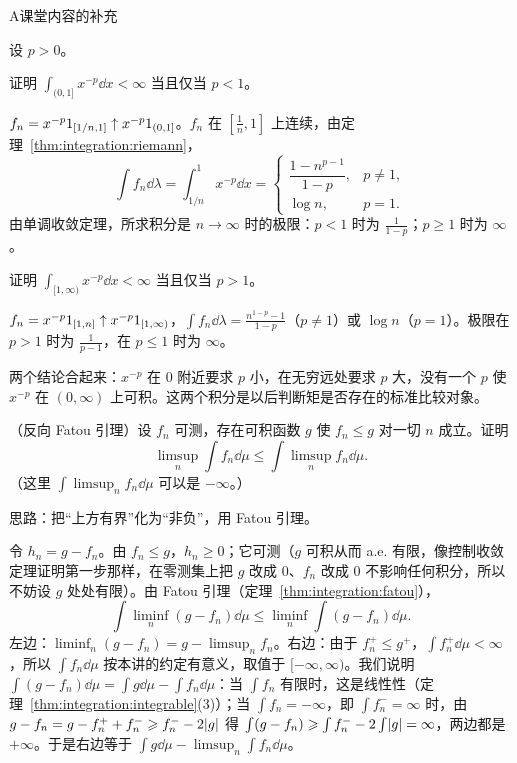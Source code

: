\begin{exercises}{A}{课堂内容的补充}
\item\label{ex:integration:A10} 设 $p>0$。
\begin{questions}
\item 证明 $\int_{(0,1]}x^{-p}\dd x<\infty$ 当且仅当 $p<1$。
\begin{solution}
$f_n=x^{-p}1_{[1/n,1]}\uparrow x^{-p}1_{(0,1]}$。$f_n$ 在 $[\frac1n,1]$ 上连续，由定理~\ref{thm:integration:riemann}，
\[
\int f_n\dd\lambda=\int_{1/n}^1x^{-p}\dd x=\begin{cases}\dfrac{1-n^{p-1}}{1-p},&p\neq1,\\[1ex] \log n,&p=1.\end{cases}
\]
由单调收敛定理，所求积分是 $n\to\infty$ 时的极限：$p<1$ 时为 $\frac1{1-p}$；$p\geqslant1$ 时为 $\infty$。
\end{solution}
\item 证明 $\int_{[1,\infty)}x^{-p}\dd x<\infty$ 当且仅当 $p>1$。
\begin{solution}
$f_n=x^{-p}1_{[1,n]}\uparrow x^{-p}1_{[1,\infty)}$，$\int f_n\dd\lambda=\frac{n^{1-p}-1}{1-p}$（$p\neq1$）或 $\log n$（$p=1$）。极限在 $p>1$ 时为 $\frac1{p-1}$，在 $p\leqslant1$ 时为 $\infty$。

两个结论合起来：$x^{-p}$ 在 $0$ 附近要求 $p$ 小，在无穷远处要求 $p$ 大，没有一个 $p$ 使 $x^{-p}$ 在 $(0,\infty)$ 上可积。这两个积分是以后判断矩是否存在的标准比较对象。
\end{solution}
\end{questions}

\item\label{ex:integration:A11} （反向 Fatou 引理）设 $f_n$ 可测，存在可积函数 $g$ 使 $f_n\leqslant g$ 对一切 $n$ 成立。证明
\[
\limsup_n\int f_n\dd\mu\leqslant\int\limsup_nf_n\dd\mu .
\]
（这里 $\int\limsup_nf_n\dd\mu$ 可以是 $-\infty$。）
\begin{solution}
思路：把“上方有界”化为“非负”，用 Fatou 引理。

令 $h_n=g-f_n$。由 $f_n\leqslant g$，$h_n\geqslant0$；它可测（$g$ 可积从而 a.e. 有限，像控制收敛定理证明第一步那样，在零测集上把 $g$ 改成 $0$、$f_n$ 改成 $0$ 不影响任何积分，所以不妨设 $g$ 处处有限）。由 Fatou 引理（定理~\ref{thm:integration:fatou}），
\[
\int\liminf_n(g-f_n)\dd\mu\leqslant\liminf_n\int(g-f_n)\dd\mu .
\]
左边：$\liminf_n(g-f_n)=g-\limsup_nf_n$。右边：由于 $f_n^+\leqslant g^+$，$\int f_n^+\dd\mu<\infty$，所以 $\int f_n\dd\mu$ 按本讲的约定有意义，取值于 $[-\infty,\infty)$。我们说明 $\int(g-f_n)\dd\mu=\int g\dd\mu-\int f_n\dd\mu$：当 $\int f_n$ 有限时，这是线性性（定理~\ref{thm:integration:integrable}(3)）；当 $\int f_n=-\infty$，即 $\int f_n^-=\infty$ 时，由 $g-f_n=g-f_n^++f_n^-\geqslant f_n^--2\lvert g\rvert$ 得 $\int(g-f_n)\geqslant\int f_n^--2\int\lvert g\rvert=\infty$，两边都是 $+\infty$。于是右边等于 $\int g\dd\mu-\limsup_n\int f_n\dd\mu$。


\end{solution}
\end{exercises}
